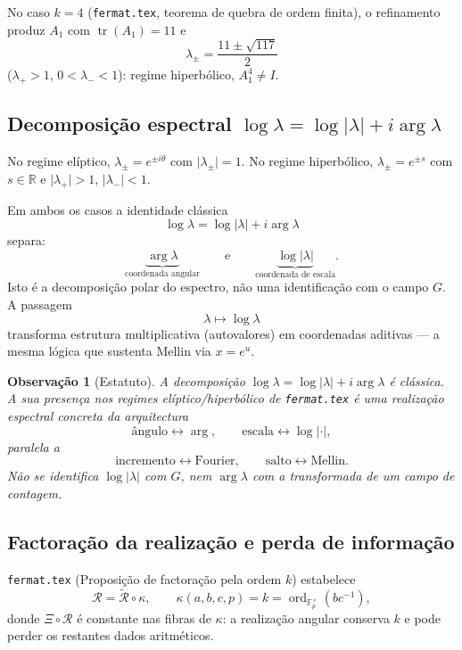 \documentclass[11pt,a4paper]{article}
\newtheorem{observacao}{Observação}
\begin{document}
No caso \(k=4\) (\texttt{fermat.tex}, teorema de quebra de ordem finita), o refinamento produz \(A_1\) com \(\operatorname{tr}(A_1)=11\) e
\[
\lambda_\pm=\frac{11\pm\sqrt{117}}{2}
\]
(\(\lambda_+>1\), \(0<\lambda_-<1\)): regime hiperbólico, \(A_1^4\neq I\).

\subsection{Decomposição espectral \(\log\lambda=\log\lvert\lambda\rvert+i\arg\lambda\)}

No regime elíptico, \(\lambda_\pm=e^{\pm i\theta}\) com \(\lvert\lambda_\pm\rvert=1\).  
No regime hiperbólico, \(\lambda_\pm=e^{\pm s}\) com \(s\in\mathbb R\) e \(\lvert\lambda_+\rvert>1\), \(\lvert\lambda_-\rvert<1\).

Em ambos os casos a identidade clássica
\[
\log\lambda=\log\lvert\lambda\rvert+i\arg\lambda
\]
separa:
\[
\underbrace{\arg\lambda}_{\text{coordenada angular}}
\qquad\text{e}\qquad
\underbrace{\log\lvert\lambda\rvert}_{\text{coordenada de escala}}.
\]
Isto é a decomposição polar do espectro, não uma identificação com o campo \(G\). A passagem
\[
\lambda\longmapsto\log\lambda
\]
transforma estrutura multiplicativa (autovalores) em coordenadas aditivas --- a mesma lógica que sustenta Mellin via \(x=e^u\).

\begin{observacao}[Estatuto]
A decomposição \(\log\lambda=\log\lvert\lambda\rvert+i\arg\lambda\) é clássica. A sua presença nos regimes elíptico/hiperbólico de \texttt{fermat.tex} é uma \emph{realização espectral concreta} da arquitectura
\[
\text{ângulo}\leftrightarrow\arg,\qquad
\text{escala}\leftrightarrow\log\lvert\cdot\rvert,
\]
paralela a
\[
\text{incremento}\leftrightarrow\text{Fourier},\qquad
\text{salto}\leftrightarrow\text{Mellin}.
\]
Não se identifica \(\log\lvert\lambda\rvert\) com \(G\), nem \(\arg\lambda\) com a transformada de um campo de contagem.
\end{observacao}

\subsection{Factoração da realização e perda de informação}

\texttt{fermat.tex} (Proposição de factoração pela ordem \(k\)) estabelece
\[
\mathcal R=\widetilde{\mathcal R}\circ\kappa,
\qquad
\kappa(a,b,c,p)=k=\operatorname{ord}_{\mathbb F_p^\times}(bc^{-1}),
\]
donde \(\Xi\circ\mathcal R\) é constante nas fibras de \(\kappa\): a realização angular conserva \(k\) e pode perder os restantes dados aritméticos.
\end{document}
